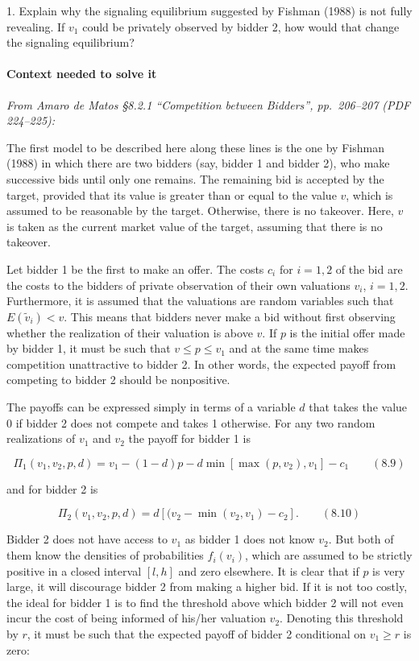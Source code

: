 \documentclass[11pt,a4paper]{article}
\begin{document}
1. Explain why the signaling equilibrium suggested by Fishman (1988) is not fully revealing. If
\(v_1\) could be privately observed by bidder 2, how would that change the signaling equilibrium?

\paragraph{Context needed to solve it}

\emph{From Amaro de Matos §8.2.1 ``Competition between Bidders'', pp.~206--207 (PDF 224--225):}

The first model to be described here along these lines is the one by Fishman (1988) in which there
are two bidders (say, bidder 1 and bidder 2), who make successive bids until only one remains. The
remaining bid is accepted by the target, provided that its value is greater than or equal to the
value \(v\), which is assumed to be reasonable by the target. Otherwise, there is no takeover. Here,
\(v\) is taken as the current market value of the target, assuming that there is no takeover.

Let bidder 1 be the first to make an offer. The costs \(c_i\) for \(i = 1, 2\) of the bid are the
costs to the bidders of private observation of their own valuations \(v_i\), \(i = 1, 2\).
Furthermore, it is assumed that the valuations are random variables such that \(E(\tilde v_i) < v\).
This means that bidders never make a bid without first observing whether the realization of their
valuation is above \(v\). If \(p\) is the initial offer made by bidder 1, it must be such that
\(v \leq p \leq v_1\) and at the same time makes competition unattractive to bidder 2. In other
words, the expected payoff from competing to bidder 2 should be nonpositive.

The payoffs can be expressed simply in terms of a variable \(d\) that takes the value 0 if bidder 2
does not compete and takes 1 otherwise. For any two random realizations of \(v_1\) and \(v_2\) the
payoff for bidder 1 is

\[\Pi_1(v_1, v_2, p, d) = v_1 - (1 - d)p - d \min[\max(p, v_2), v_1] - c_1 \qquad (8.9)\]

and for bidder 2 is

\[\Pi_2(v_1, v_2, p, d) = d[(v_2 - \min(v_2, v_1) - c_2]. \qquad (8.10)\]

Bidder 2 does not have access to \(v_1\) as bidder 1 does not know \(v_2\). But both of them know
the densities of probabilities \(f_i(v_i)\), which are assumed to be strictly positive in a closed
interval \([l, h]\) and zero elsewhere. It is clear that if \(p\) is very large, it will discourage
bidder 2 from making a higher bid. If it is not too costly, the ideal for bidder 1 is to find the
threshold above which bidder 2 will not even incur the cost of being informed of his/her valuation
\(v_2\). Denoting this threshold by \(r\), it must be such that the expected payoff of bidder 2
conditional on \(v_1 \geq r\) is zero:
\end{document}
